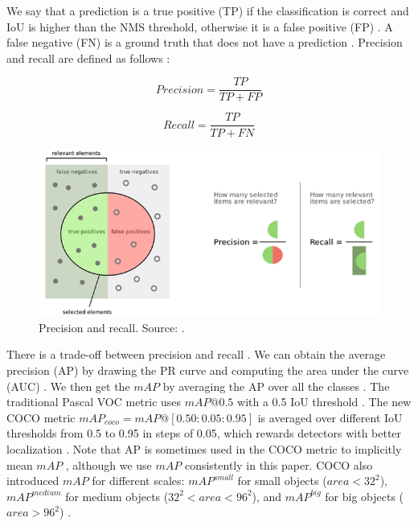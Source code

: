 \documentclass[a4paper, 11pt, oneside]{article}
\begin{document}
We say that a prediction is a true positive (TP) if the classification is correct and IoU is higher than the NMS threshold,
otherwise it is a false positive (FP) \cite{elgendy2020deep, liu2020deep, planche2019hands}. A false negative (FN) is a
ground truth that does not have a prediction \cite{planche2019hands}. Precision and recall are defined as follows
\cite{burkov2019hundred, davis2006relationship}:

$$Precision = \frac{TP}{TP + FP}$$

$$Recall = \frac{TP}{TP + FN}$$

\begin{figure}[ht]
  \begin{center}
    \includegraphics[width=\textwidth]{precision_recall.png}
  \end{center}
  \caption{Precision and recall. Source: \cite{precisionrecall}.}
\end{figure}

There is a trade-off between precision and recall
\cite{elgendy2020deep, geron2019hands, burkov2019hundred, planche2019hands}. We can obtain the average precision
(AP) by drawing the PR curve and computing the area under the curve (AUC) \cite{elgendy2020deep, planche2019hands}.
We then get the $mAP$ by averaging the AP over all the classes \cite{elgendy2020deep, geron2019hands, planche2019hands}.
The traditional Pascal VOC metric uses $mAP@0.5$ with a 0.5 IoU threshold \cite{liu2020deep, everingham2010pascal}.
The new COCO metric $mAP_{coco} = mAP@[0.50:0.05:0.95]$ is averaged over
different IoU thresholds from 0.5 to 0.95 in steps of 0.05, which rewards detectors with better localization
\cite{liu2020deep, cocometrics}. Note that AP is sometimes used in the COCO metric to implicitly mean $mAP$
\cite{cocometrics}, although we use $mAP$ consistently in this paper. COCO also introduced $mAP$ for different scales:
$mAP^{small}$ for small objects ($area < 32^2$), $mAP^{medium}$ for medium objects ($32^2 < area < 96^2$),
and $mAP^{big}$ for big objects ($area > 96^2$) \cite{liu2020deep, cocometrics}.
\end{document}
